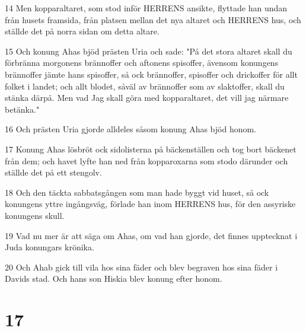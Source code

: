 \par 14 Men kopparaltaret, som stod inför HERRENS ansikte, flyttade han undan från husets framsida, från platsen mellan det nya altaret och HERRENS hus, och ställde det på norra sidan om detta altare.
\par 15 Och konung Ahas bjöd prästen Uria och sade: "På det stora altaret skall du förbränna morgonens brännoffer och aftonens spisoffer, ävensom konungens brännoffer jämte hans spisoffer, så ock brännoffer, spisoffer och drickoffer för allt folket i landet; och allt blodet, såväl av brännoffer som av slaktoffer, skall du stänka därpå. Men vad Jag skall göra med kopparaltaret, det vill jag närmare betänka."
\par 16 Och prästen Uria gjorde alldeles såsom konung Ahas bjöd honom.
\par 17 Konung Ahas lösbröt ock sidolisterna på bäckenställen och tog bort bäckenet från dem; och havet lyfte han ned från kopparoxarna som stodo därunder och ställde det på ett stengolv.
\par 18 Och den täckta sabbatsgången som man hade byggt vid huset, så ock konungens yttre ingångsväg, förlade han inom HERRENS hus, för den assyriske konungens skull.
\par 19 Vad nu mer är att säga om Ahas, om vad han gjorde, det finnes upptecknat i Juda konungars krönika.
\par 20 Och Ahab gick till vila hos sina fäder och blev begraven hos sina fäder i Davids stad. Och hans son Hiskia blev konung efter honom.

\chapter{17}

